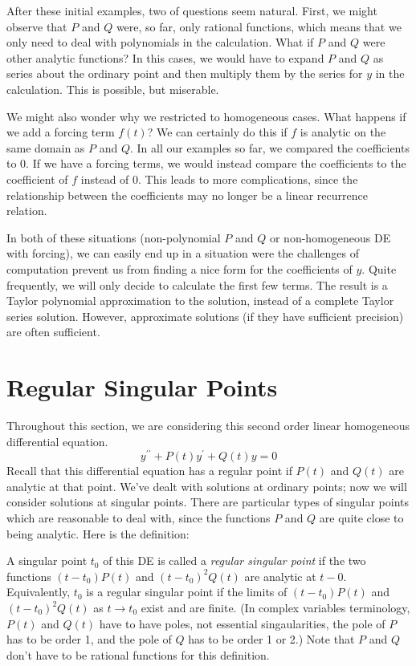 \documentclass[fleqn,letterpaper]{report}
\begin{document}
After these initial examples, two of questions seem
natural. First, we might observe that $P$ and $Q$ were, so
far, only rational functions, which means that we only need to
deal with polynomials in the calculation. What if $P$ and $Q$
were other analytic functions? In this cases, we would have
to expand $P$ and $Q$ as series about the ordinary point and
then multiply them by the series for $y$ in the calculation.
This is possible, but miserable.

We might also wonder why we restricted to homogeneous cases.
What happens if we add a forcing term $f(t)$? We can
certainly do this if $f$ is analytic on the same domain as $P$
and $Q$. In all our examples so far, we compared the
coefficients to $0$. If we have a forcing terms, we would
instead compare the coefficients to the coefficient of $f$
instead of $0$. This leads to more complications, since the
relationship between the coefficients may no longer be a
linear recurrence relation.

In both of these situations (non-polynomial $P$ and $Q$ or
non-homogeneous DE with forcing), we can easily end up in a
situation were the challenges of computation prevent us from
finding a nice form for the coefficients of $y$. Quite
frequently, we will only decide to calculate the first few
terms. The result is a Taylor polynomial approximation to the
solution, instead of a complete Taylor series solution.
However, approximate solutions (if they have sufficient
precision) are often sufficient.

\section{Regular Singular Points}
\label{regular-singular-points}

Throughout this section, we are considering this second order
linear homogeneous differential equation.
\begin{equation*}
y^{\prime \prime} + P(t) y^\prime + Q(t) y = 0
\end{equation*}
Recall that this differential equation has a regular
point if $P(t)$ and $Q(t)$ are analytic at that point. We've
dealt with solutions at ordinary points; now we will consider
solutions at singular points. There are particular types of
singular points which are reasonable to deal with, since the
functions $P$ and $Q$ are quite close to being analytic. Here
is the definition:

\begin{defn}
A singular point $t_0$ of this DE is called a \emph{regular
singular point} if the two functions $(t-t_0)P(t)$ and
$(t-t_0)^2 Q(t)$ are analytic at $t-0$. Equivalently,
$t_0$ is a regular singular point if the limits of $(t-t_0) P(t)$ and
$(t-t_0)^2 Q(t)$ as $t \rightarrow t_0$ exist and are finite. 
(In complex variables terminology, $P(t)$ and $Q(t)$ have
to have poles, not essential singaularities, the pole of $P$
has to be order 1, and the pole of $Q$ has to be order 1 or 2.)
Note that $P$ and $Q$ don't have to be rational
functions for this definition. 
\end{defn}
\end{document}
